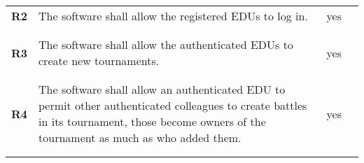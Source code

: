 \begin{longtable}[H]{l p{6.5cm} l p{3cm}}
    \textbf{R2}  & The software shall allow the registered EDUs to log in.                                                                                                                                                                                                                  & {\color{green}yes}   &                                                                                         \\
                 &                                                                                                                                                                                                                                                                          &                      &                                                                                         \\\hline & & & \\
    \textbf{R3}  & The software shall allow the authenticated EDUs to create new tournaments.                                                                                                                                                                                               & {\color{green}yes}   &                                                                                         \\
                 &                                                                                                                                                                                                                                                                          &                      &                                                                                         \\\hline & & & \\
    \textbf{R4}  & The software shall allow an authenticated EDU to permit other authenticated colleagues to create battles in its tournament, those become owners of the tournament as much as who added them.                                                                             & {\color{green}yes}   &                                                                                         \\
                 &                                                                                                                                                                                                                                                                          &                      &                                                                                         \\\hline & & & \\

\end{longtable}
